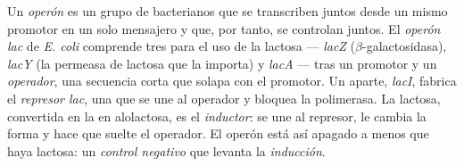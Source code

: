 \begin{definition}\label{def:b1:expression-control:operon}
Un \emph{operón} es un grupo de  bacterianos que se transcriben juntos
desde un mismo promotor en un solo mensajero y que, por tanto, se controlan
juntos. El \emph{operón lac} de \emph{E. coli} comprende tres  para el
uso de la lactosa --- \emph{lacZ} ($\beta$-galactosidasa), \emph{lacY} (la
permeasa de lactosa que la importa) y \emph{lacA} --- tras un promotor y un
\emph{operador}, una secuencia corta que solapa con el promotor. Un 
aparte, \emph{lacI}, fabrica el \emph{represor lac}, una  que se une
al operador y bloquea la polimerasa. La lactosa, convertida en la  en
alolactosa, es el \emph{inductor}: se une al represor, le cambia la forma y
hace que suelte el operador. El operón está así apagado a menos que haya
lactosa: un \emph{control negativo} que levanta la \emph{inducción}.
\end{definition}

